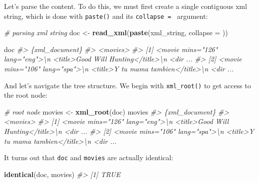 \documentclass[
]{book}
\newenvironment{Shaded}{\begin{snugshade}}{\end{snugshade}}
\newcommand{\AttributeTok}[1]{\textcolor[rgb]{0.13,0.29,0.53}{#1}}
\newcommand{\CommentTok}[1]{\textcolor[rgb]{0.56,0.35,0.01}{\textit{#1}}}
\newcommand{\FunctionTok}[1]{\textcolor[rgb]{0.13,0.29,0.53}{\textbf{#1}}}
\newcommand{\NormalTok}[1]{#1}
\newcommand{\OtherTok}[1]{\textcolor[rgb]{0.56,0.35,0.01}{#1}}
\newcommand{\StringTok}[1]{\textcolor[rgb]{0.31,0.60,0.02}{#1}}
\begin{document}
Let's parse the content. To do this, we must first create a single contiguous
xml string, which is done with \texttt{paste()} and its \texttt{collapse\ =\ \textquotesingle{}\textquotesingle{}} argument:

\begin{Shaded}
\begin{Highlighting}[]
\CommentTok{\# parsing xml string}
\NormalTok{doc }\OtherTok{\textless{}{-}} \FunctionTok{read\_xml}\NormalTok{(}\FunctionTok{paste}\NormalTok{(xml\_string, }\AttributeTok{collapse =} \StringTok{\textquotesingle{}\textquotesingle{}}\NormalTok{))}

\NormalTok{doc}
\CommentTok{\#\textgreater{} \{xml\_document\}}
\CommentTok{\#\textgreater{} \textless{}movies\textgreater{}}
\CommentTok{\#\textgreater{} [1] \textless{}movie mins="126" lang="eng"\textgreater{}\textbackslash{}n  \textless{}title\textgreater{}Good Will Hunting\textless{}/title\textgreater{}\textbackslash{}n  \textless{}dir ...}
\CommentTok{\#\textgreater{} [2] \textless{}movie mins="106" lang="spa"\textgreater{}\textbackslash{}n  \textless{}title\textgreater{}Y tu mama tambien\textless{}/title\textgreater{}\textbackslash{}n  \textless{}dir ...}
\end{Highlighting}
\end{Shaded}

And let's navigate the tree structure. We begin with \texttt{xml\_root()} to get
access to the root node:

\begin{Shaded}
\begin{Highlighting}[]
\CommentTok{\# root node}
\NormalTok{movies }\OtherTok{\textless{}{-}} \FunctionTok{xml\_root}\NormalTok{(doc)}
\NormalTok{movies}
\CommentTok{\#\textgreater{} \{xml\_document\}}
\CommentTok{\#\textgreater{} \textless{}movies\textgreater{}}
\CommentTok{\#\textgreater{} [1] \textless{}movie mins="126" lang="eng"\textgreater{}\textbackslash{}n  \textless{}title\textgreater{}Good Will Hunting\textless{}/title\textgreater{}\textbackslash{}n  \textless{}dir ...}
\CommentTok{\#\textgreater{} [2] \textless{}movie mins="106" lang="spa"\textgreater{}\textbackslash{}n  \textless{}title\textgreater{}Y tu mama tambien\textless{}/title\textgreater{}\textbackslash{}n  \textless{}dir ...}
\end{Highlighting}
\end{Shaded}

It turns out that \texttt{doc} and \texttt{movies} are actually identical:

\begin{Shaded}
\begin{Highlighting}[]
\FunctionTok{identical}\NormalTok{(doc, movies)}
\CommentTok{\#\textgreater{} [1] TRUE}
\end{Highlighting}
\end{Shaded}
\end{document}
